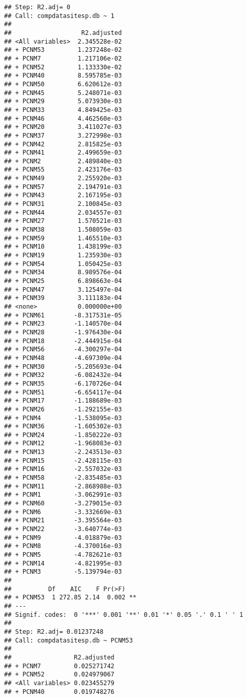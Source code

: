 \documentclass[
]{article}
\begin{document}
\begin{verbatim}
## Step: R2.adj= 0 
## Call: compdatasitesp.db ~ 1 
##  
##                   R2.adjusted
## <All variables>  2.345528e-02
## + PCNM53         1.237248e-02
## + PCNM7          1.217106e-02
## + PCNM52         1.133330e-02
## + PCNM40         8.595785e-03
## + PCNM50         6.620612e-03
## + PCNM45         5.248071e-03
## + PCNM29         5.073930e-03
## + PCNM33         4.849425e-03
## + PCNM46         4.462560e-03
## + PCNM20         3.411027e-03
## + PCNM37         3.272998e-03
## + PCNM42         2.815825e-03
## + PCNM41         2.499659e-03
## + PCNM2          2.489840e-03
## + PCNM55         2.423176e-03
## + PCNM49         2.255920e-03
## + PCNM57         2.194791e-03
## + PCNM43         2.167195e-03
## + PCNM31         2.100845e-03
## + PCNM44         2.034557e-03
## + PCNM27         1.570521e-03
## + PCNM38         1.508059e-03
## + PCNM59         1.465510e-03
## + PCNM10         1.438199e-03
## + PCNM19         1.235930e-03
## + PCNM54         1.050425e-03
## + PCNM34         8.989576e-04
## + PCNM25         6.898663e-04
## + PCNM47         3.125497e-04
## + PCNM39         3.111183e-04
## <none>           0.000000e+00
## + PCNM61        -8.317531e-05
## + PCNM23        -1.140570e-04
## + PCNM28        -1.976430e-04
## + PCNM18        -2.444915e-04
## + PCNM56        -4.300297e-04
## + PCNM48        -4.697309e-04
## + PCNM30        -5.205693e-04
## + PCNM32        -6.082432e-04
## + PCNM35        -6.170726e-04
## + PCNM51        -6.654117e-04
## + PCNM17        -1.188689e-03
## + PCNM26        -1.292155e-03
## + PCNM4         -1.538095e-03
## + PCNM36        -1.605302e-03
## + PCNM24        -1.850222e-03
## + PCNM12        -1.968083e-03
## + PCNM13        -2.243513e-03
## + PCNM15        -2.428115e-03
## + PCNM16        -2.557032e-03
## + PCNM58        -2.835485e-03
## + PCNM11        -2.868988e-03
## + PCNM1         -3.062991e-03
## + PCNM60        -3.279015e-03
## + PCNM6         -3.332669e-03
## + PCNM21        -3.395564e-03
## + PCNM22        -3.640774e-03
## + PCNM9         -4.018879e-03
## + PCNM8         -4.370016e-03
## + PCNM5         -4.782621e-03
## + PCNM14        -4.821995e-03
## + PCNM3         -5.139794e-03
## 
##          Df    AIC    F Pr(>F)   
## + PCNM53  1 272.85 2.14  0.002 **
## ---
## Signif. codes:  0 '***' 0.001 '**' 0.01 '*' 0.05 '.' 0.1 ' ' 1
## 
## Step: R2.adj= 0.01237248 
## Call: compdatasitesp.db ~ PCNM53 
##  
##                 R2.adjusted
## + PCNM7         0.025271742
## + PCNM52        0.024979067
## <All variables> 0.023455279
## + PCNM40        0.019748276

\end{verbatim}
\end{document}
